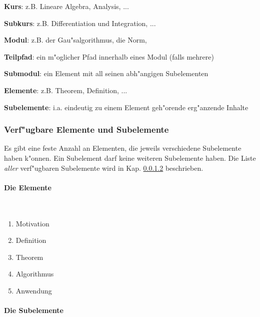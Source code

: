 \begin{list_sabina}
        \item \textbf{Kurs}: z.B. Lineare Algebra, Analysis, ...
        \item \textbf{Subkurs}: z.B. Differentiation und Integration, ...
        \item \textbf{Modul}: z.B. der Gau"salgorithmus, die Norm, 
        \item \textbf{Teilpfad}: ein m"oglicher Pfad innerhalb eines Modul (falls mehrere) 
        \item \textbf{Submodul}: ein Element mit all seinen abh"angigen Subelementen
        \item \textbf{Elemente}: z.B. Theorem, Definition, ...
        \item \textbf{Subelemente}: i.a. eindeutig zu einem Element geh"orende erg"anzende Inhalte
\end{list_sabina}



\subsubsection{Verf"ugbare Elemente und Subelemente}

Es gibt eine feste Anzahl an Elementen, die jeweils verschiedene
Subelemente haben k"onnen. Ein Subelement darf keine weiteren
Subelemente haben. Die Liste \textit{aller} verf"ugbaren Subelemente
wird in Kap. \ref{sub_elemente} beschrieben.


\paragraph{Die Elemente}\label{elemente}

\mbox{ }
\vspace{0mm}

    \begin{enumerate}
    \item Motivation
    \item Definition
    \item Theorem
    \item Algorithmus
    \item Anwendung
    \end{enumerate}


\paragraph{Die Subelemente}\label{sub_elemente}

